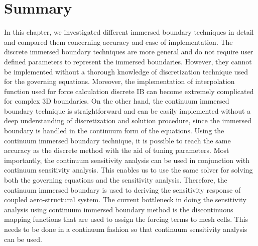 \section{Summary}
In this chapter, we investigated different immersed boundary techniques in detail and compared them concerning accuracy and ease of implementation. The discrete immersed boundary techniques are more general and do not require user defined parameters to represent the immersed boundaries. However, they cannot be implemented without a thorough knowledge of discretization technique used for the governing equations. Moreover, the implementation of interpolation function used for force calculation discrete IB can become extremely complicated for complex 3D boundaries. On the other hand, the continuum immersed boundary technique is straightforward and can be easily implemented without a deep understanding of discretization and solution procedure, since the immersed boundary is handled in the continuum form of the equations. Using the continuum immersed boundary technique, it is possible to reach the same accuracy as the discrete method with the aid of tuning parameters. Most importantly, the continuum sensitivity analysis can be used in conjunction with continuum sensitivity analysis. This enables us to use the same solver for solving both the governing equations and the sensitivity analysis. Therefore, the continuum immersed boundary is used to deriving the sensitivity response of coupled aero-structural system. The current bottleneck in doing the sensitivity analysis using continuum immersed boundary method is the discontinuous mapping functions that are used to assign the forcing terms to mesh cells. This needs to be done in a continuum fashion so that continuum sensitivity analysis can be used.